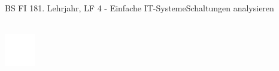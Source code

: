 \documentclass[oneside,openany,headings=optiontotoc,11pt,numbers=noenddot]{scrreprt}
\begin{document}
\begin{worksheet}{BS FI 18}{1. Lehrjahr, LF 4 - Einfache IT-Systeme}{Schaltungen analysieren}
\begin{framed}
		\end{framed}
		\begin{framed}
			\footnotesize{\textbf{\color{codegray}{Logische Funktion:}}}\\
			\includegraphics[width=0.1\textwidth]{../../empty.jpg}
		\end{framed}
	\end{worksheet}
\end{document}

